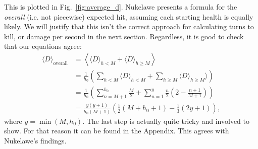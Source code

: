 \documentclass[../../main.tex]{subfiles}
\begin{document}
			This is plotted in Fig.~\ref{fig:average_d}. Nukelawe presents a formula for the \emph{overall} (i.e. not piecewise) expected hit, assuming each starting health is equally likely. We will justify that this isn't the correct approach for calculating turns to kill, or damage per second in the next section. Regardless, it is good to check that our equations agree:
			\begin{align}
				\langle D \rangle_\text{overall} &= \left \langle \langle D \rangle_{h < M} + \langle D\rangle_{h\ge M} \right \rangle\\
				&= \frac{1}{h_0}\left(\sum_{h<M} \langle D \rangle_{h < M} + \sum_{h\ge M}\langle D\rangle_{h\ge M} \rangle \right)\\
				&= \frac{1}{h_0}\left(
					\sum_{n=M+1}^{h_{0}}\frac{M}{2} +
					\sum_{n=1}^{y} \frac{n}{2}\left(2 - \frac{n + 1}{M+1}\right)
				\right) \\
				&= \frac{y(y+1)}{h_0(M+1)}\left(\frac{1}{2}{(M+h_0+1)}-\frac{1}{3}(2y+1) \right),
			\end{align}
			where $y=\min(M, h_0)$. The last step is actually quite tricky and involved to show. For that reason it can be found in the Appendix. This agrees with Nukelawe's findings.
\end{document}

